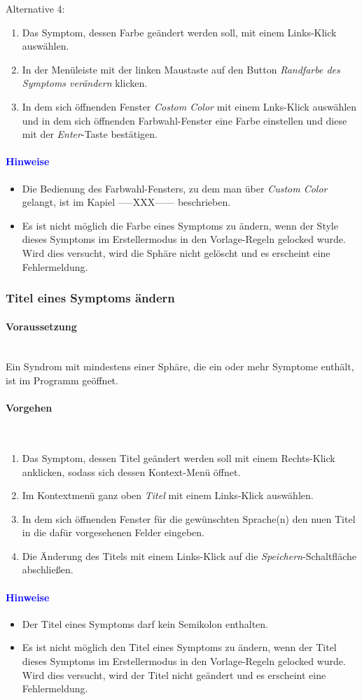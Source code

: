 \documentclass[enabledeprecatedfontcommands,fontsize=11pt,paper=a4,twoside]{scrartcl}
\newcommand*{\hint}{\paragraph{\textcolor{blue}{Hinweise}}}
\newcommand*{\condition}{\paragraph{Voraussetzung}$\;$ \vspace{0.2cm}\\}
\newcommand*{\actions}{\paragraph{Vorgehen} $\;$\vspace{0.2cm}\\}
\begin{document}
		Alternative 4:
			\begin{enumerate}
			\item Das Symptom, dessen Farbe geändert werden soll, mit einem Links-Klick auswählen.
			\item In der Menüleiste mit der linken Maustaste auf den Button \textit{Randfarbe des Symptoms verändern} klicken.
			\item In dem sich öffnenden Fenster \textit{Costom Color} mit einem Lnks-Klick auswählen und in dem sich öffnenden Farbwahl-Fenster eine Farbe einstellen und diese mit der \textit{Enter}-Taste bestätigen.
		\end{enumerate}
		\hint
		\begin{itemize}
			\item Die Bedienung des Farbwahl-Fensters, zu dem man über \textit{Custom Color} gelangt, ist im Kapiel -----XXX------ beschrieben.
			\item Es ist nicht möglich die Farbe eines Symptoms zu ändern, wenn der Style dieses Symptoms im Erstellermodus in den Vorlage-Regeln gelocked wurde. Wird dies versucht, wird die Sphäre nicht gelöscht und es erscheint eine Fehlermeldung.
	\end{itemize}	
		\subsubsection{Titel eines Symptoms ändern}
						\condition 	
		Ein Syndrom mit mindestens einer Sphäre, die ein oder mehr Symptome enthält, ist im Programm geöffnet. 
		\actions  
		\begin{enumerate}
			\item Das Symptom, dessen Titel geändert werden soll mit einem Rechts-Klick anklicken, sodass sich dessen Kontext-Menü öffnet.
			\item Im Kontextmenü ganz oben \textit{Titel} mit einem Links-Klick auswählen. 
			\item In dem sich öffnenden Fenster für die gewünschten Sprache(n) den nuen Titel in die dafür vorgesehenen Felder eingeben.
			\item Die Änderung des Titels mit einem Links-Klick auf die \textit{Speichern}-Schaltfläche abschließen.
		\end{enumerate}
		\hint
		\begin{itemize}
			\item Der Titel eines Symptoms darf kein Semikolon enthalten.
			\item 
Es ist nicht möglich den Titel eines Symptoms zu ändern, wenn der Titel dieses Symptoms im Erstellermodus in den Vorlage-Regeln gelocked wurde. Wird dies versucht, wird der Titel nicht geändert und es erscheint eine Fehlermeldung.
		\end{itemize}
\end{document}
